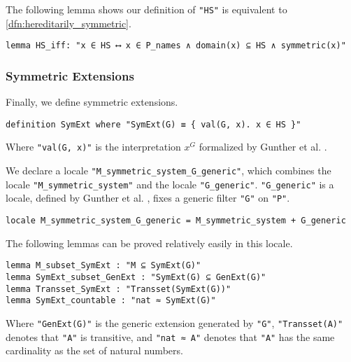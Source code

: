\documentclass{report}
\newenvironment{isaframe}{\begin{mdframed}[topline=false, rightline=false, bottomline=false]}{\end{mdframed}}
\begin{document}
The following lemma shows our definition of \texttt{"HS"} is equivalent to \cref{dfn:hereditarily_symmetric}.

\begin{isaframe}
\begin{verbatim}
lemma HS_iff: "x ∈ HS ⟷ x ∈ P_names ∧ domain(x) ⊆ HS ∧ symmetric(x)" 
\end{verbatim}
\end{isaframe}


\subsubsection{Symmetric Extensions}
Finally, we define symmetric extensions.

\begin{isaframe}
\begin{verbatim}
definition SymExt where "SymExt(G) ≡ { val(G, x). x ∈ HS }" 
\end{verbatim}
\end{isaframe}

Where \texttt{"val(G, x)"} is the interpretation $x^G$ formalized by Gunther et al. \cite{gunther_forcing}.

We declare a locale \texttt{"M\_symmetric\_system\_G\_generic"},
which combines the locale \texttt{"M\_symmetric\_system"} and the locale \texttt{"G\_generic"}.
\texttt{"G\_generic"} is a locale, defined by Gunther et al. \cite{gunther_forcing}, fixes a generic filter \texttt{"G"} on \texttt{"P"}.

\begin{isaframe}
\begin{verbatim}
locale M_symmetric_system_G_generic = M_symmetric_system + G_generic
\end{verbatim}
\end{isaframe}

The following lemmas can be proved relatively easily in this locale.

\begin{isaframe}
\begin{verbatim}
lemma M_subset_SymExt : "M ⊆ SymExt(G)" 
lemma SymExt_subset_GenExt : "SymExt(G) ⊆ GenExt(G)" 
lemma Transset_SymExt : "Transset(SymExt(G))" 
lemma SymExt_countable : "nat ≈ SymExt(G)" 
\end{verbatim}
\end{isaframe}

Where \texttt{"GenExt(G)"} is the generic extension generated by \texttt{"G"}, 
\texttt{"Transset(A)"} denotes that \texttt{"A"} is transitive, and
\texttt{"nat ≈ A"} denotes that \texttt{"A"} has the same cardinality as the set of natural numbers.
\end{document}
